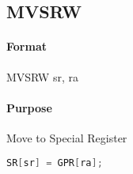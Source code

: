 \subsection{MVSRW}


\paragraph{Format} MVSRW sr, ra

\paragraph{Purpose} Move to Special Register

\begin{lstlisting}[language=C]
    SR[sr] = GPR[ra];
\end{lstlisting}
